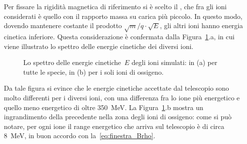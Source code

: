 Per fissare la rigidità magnetica di riferimento si è scelto il , che fra gli ioni considerati è quello con il rapporto massa su carica più piccolo.
In questo modo, dovendo mantenere costante il prodotto $\sqrt{m}/q \cdot \sqrt{E}$, gli altri ioni hanno energia cinetica inferiore.
Questa considerazione è confermata dalla Figura~\ref{fig:KinE}.a, in cui viene illustrato lo spettro delle energie cinetiche dei diversi ioni.
\begin{figure} [!p]
	\centering
	
	\caption{Lo spettro delle energie cinetiche~$E$ degli ioni simulati: in (a) per tutte le specie, in (b) per i soli ioni di ossigeno.} \label{fig:KinE}
\end{figure}
Da tale figura si evince che le energie cinetiche accettate dal telescopio sono molto differenti per i diversi ioni, con una differenza fra lo ione più energetico e quello meno energetico di oltre 350~MeV.
La Figura~\ref{fig:KinE}.b mostra un ingrandimento della precedente nella zona degli ioni di ossigeno: come si può notare, per ogni ione il range energetico che arriva sul telescopio è di circa 8~MeV, in buon accordo con la~\ref{eq:finestra_Brho}.


